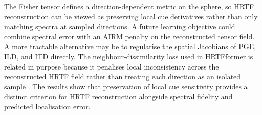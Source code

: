 \documentclass[journal]{IEEEtran}
\begin{document}
The Fisher tensor defines a direction-dependent metric on the sphere, so HRTF reconstruction can be viewed as preserving local cue derivatives rather than only matching spectra at sampled directions. A future learning objective could combine spectral error with an AIRM penalty on the reconstructed tensor field. A more tractable alternative may be to regularise the spatial Jacobians of PGE, ILD, and ITD directly. The neighbour-dissimilarity loss used in HRTFformer is related in purpose because it penalises local inconsistency across the reconstructed HRTF field rather than treating each direction as an isolated sample \cite{Hu2026HRTFformer}. The results show that preservation of local cue sensitivity provides a distinct criterion for HRTF reconstruction alongside spectral fidelity and predicted localisation error. 
\end{document}
